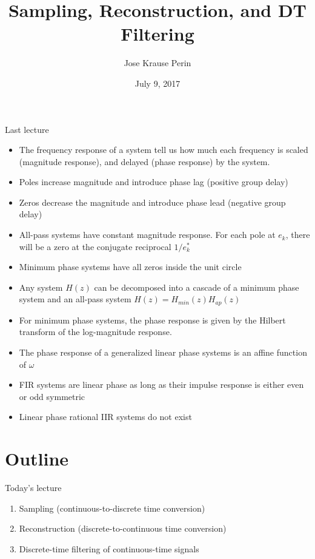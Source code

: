 \documentclass[10pt, aspectratio=169]{beamer}
\title[EE 264]{Sampling, Reconstruction, and DT Filtering}
\author{Jose Krause Perin}
\institute{Stanford University}
\date{July 9, 2017}
\begin{document}
\begin{frame}
  \titlepage
\end{frame}

\begin{frame}{Last lecture}
\begin{itemize}
	\item The frequency response of a system tell us how much each frequency is scaled (magnitude response), and delayed (phase response) by the system.
	\item Poles increase magnitude and introduce phase lag (positive group delay)
	\item Zeros decrease the magnitude and introduce phase lead (negative group delay)
	\item All-pass systems have constant magnitude response. For each pole at $e_k$, there will be a zero at the conjugate reciprocal $1/e^*_k$
	\item Minimum phase systems have all zeros inside the unit circle
	\item Any system $H(z)$ can be decomposed into a cascade of a minimum phase system and an all-pass system $H(z) = H_{min}(z)H_{ap}(z)$
	\item For minimum phase systems, the phase response is given by the Hilbert transform of the log-magnitude response. 
	\item The phase response of a generalized linear phase systems is an affine function of $\omega$
	\item FIR systems are linear phase as long as their impulse response is either even or odd symmetric
	\item Linear phase rational IIR systems do not exist
\end{itemize}
\end{frame}

%
\section{Outline}
\begin{frame}{Today's lecture} 

\begin{enumerate}
	\item Sampling (continuous-to-discrete time conversion)
	\item Reconstruction (discrete-to-continuous time conversion)
	\item Discrete-time filtering of continuous-time signals
\end{enumerate}

\end{frame}
\end{document}
